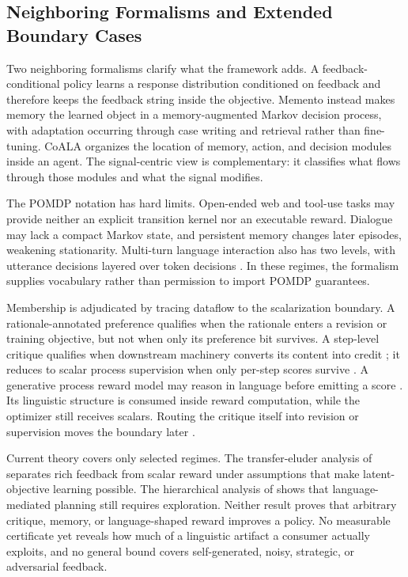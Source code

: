 \subsection{Neighboring Formalisms and Extended Boundary Cases}
\label{supp:subsec:framework-boundaries}

Two neighboring formalisms clarify what the framework adds. A feedback-conditional policy \citep{luo2025fcp} learns a response distribution conditioned on feedback and therefore keeps the feedback string inside the objective. Memento \citep{zhou2025memento} instead makes memory the learned object in a memory-augmented Markov decision process, with adaptation occurring through case writing and retrieval rather than fine-tuning. CoALA \citep{sumers2023cognitive} organizes the location of memory, action, and decision modules inside an agent. The signal-centric view is complementary: it classifies what flows through those modules and what the signal modifies.

The POMDP notation has hard limits. Open-ended web and tool-use tasks may provide neither an explicit transition kernel nor an executable reward. Dialogue may lack a compact Markov state, and persistent memory changes later episodes, weakening stationarity. Multi-turn language interaction also has two levels, with utterance decisions layered over token decisions \citep{abdulhai2023lmrl,zhou2024archer}. In these regimes, the formalism supplies vocabulary rather than permission to import POMDP guarantees.

Membership is adjudicated by tracing dataflow to the scalarization boundary. A rationale-annotated preference qualifies when the rationale enters a revision or training objective, but not when only its preference bit survives. A step-level critique qualifies when downstream machinery converts its content into credit \citep{xie2025capo}; it reduces to scalar process supervision when only per-step scores survive \citep{lightman2024let}. A generative process reward model may reason in language before emitting a score \citep{zhao2025genprm}. Its linguistic structure is consumed inside reward computation, while the optimizer still receives scalars. Routing the critique itself into revision or supervision moves the boundary later \citep{wang2026reward}.

Current theory covers only selected regimes. The transfer-eluder analysis of \citet{xu2025formalizing} separates rich feedback from scalar reward under assumptions that make latent-objective learning possible. The hierarchical analysis of \citet{he2024words} shows that language-mediated planning still requires exploration. Neither result proves that arbitrary critique, memory, or language-shaped reward improves a policy. No measurable certificate yet reveals how much of a linguistic artifact a consumer actually exploits, and no general bound covers self-generated, noisy, strategic, or adversarial feedback.

